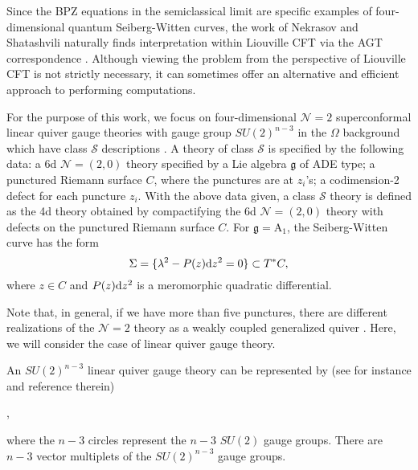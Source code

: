 \documentclass[11pt]{article}
\numberwithin{equation}{section}
\newcommand{\rd}{{\rm d}}
\begin{document}
Since the BPZ equations in the semiclassical limit are specific examples of four-dimensional quantum Seiberg-Witten curves, the work of Nekrasov and Shatashvili naturally finds interpretation within Liouville CFT via the AGT correspondence \cite{Alday:2009aq}.  Although viewing the problem from the perspective of Liouville CFT is not strictly necessary, it can sometimes offer an alternative and efficient approach to performing computations. 



 For the purpose of this work, we focus on four-dimensional $\mathcal{N}=2$ superconformal linear quiver gauge theories with gauge group $SU(2)^{n-3}$ in the $\Omega$ background which have class $\mathcal{S}$ descriptions \cite{Gaiotto:2009we}. 
A theory of class $\mathcal{S}$ is specified by the following data: a 6d $\mathcal{N}=(2,0)$ theory specified by a Lie algebra $\mathfrak{g}$ of ADE type; a punctured Riemann surface $C$, where the punctures are at ${z_i}$'s; a codimension-2 defect for each puncture ${z_i}$.
With the above data given, a class $\mathcal{S}$ theory is defined as the 4d theory obtained by compactifying the 6d $\mathcal{N}=(2,0)$ theory with defects on the punctured Riemann surface $C$. For $\mathfrak{g}=\text{A}_1$, the Seiberg-Witten curve has the form 
\begin{equation}
\label{SWcurve}
    \Sigma=\{\lambda^2-P(z)\rd z^2=0\}\subset T^*C,
\end{equation}
where $z\in C$ and $P(z)\rd z^2$ is a meromorphic quadratic differential.

Note that, in general, if we have  more than five punctures, there are different realizations of the $\mathcal{N}=2$ theory as a weakly coupled generalized quiver \cite{Gaiotto:2009we}. Here,  we will consider the case of linear quiver gauge theory.

An $SU(2)^{n-3}$ linear quiver gauge theory can be represented by (see for instance \cite{Jeong:2017mfh} and reference therein) \begin{center}
,
\end{center}
where the $n-3$ circles represent the $n-3$ $SU(2)$ gauge groups. 
%
There are $n-3$ vector multiplets of the $SU(2)^{n-3}$ gauge groups.
\end{document}
